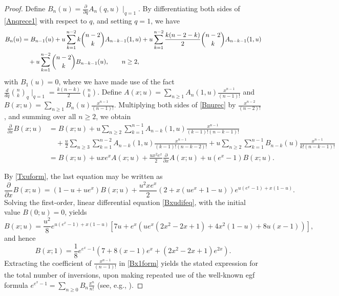 \documentclass[11pt,a4paper]{article}
\begin{document}
\begin{proof}
Define $B_n(u)=\frac{\partial}{\partial q}A_n(q,u)\mid_{q=1}$. By differentiating both sides of \eqref{Anqrece1} with respect to $q$, and setting $q=1$, we have
\begin{align}
B_n(u)&=B_{n-1}(u)
+u\sum_{k=1}^{n-2}k\binom{n-2}{k}A_{n-k-1}(1,u)+u\sum_{k=1}^{n-2}\frac{k(n-2-k)}{2}\binom{n-2}{k}A_{n-k-1}(1,u)\notag\\
&\quad+u\sum_{k=1}^{n-2}\binom{n-2}{k}B_{n-k-1}(u), \qquad n \geq 2, \label{Bnurec}
\end{align}
with $B_1(u)=0$, where we have made use of the fact $\frac{d}{dq}\binom{n}{k}_q\mid_{q=1}=\frac{k(n-k)}{2}\binom{n}{k}$.  Define $A(x;u)=\sum_{n\geq1}A_n(1,u)\frac{x^{n-1}}{(n-1)!}$ and $B(x;u)=\sum_{n\geq1}B_n(u)\frac{x^{n-1}}{(n-1)!}$. Multiplying both sides of \eqref{Bnurec} by $\frac{x^{n-2}}{(n-2)!}$, and summing over all $n \geq2$, we obtain
\begin{align*}
\frac{\partial}{\partial x}B(x;u)&=B(x;u)
+u\sum_{n\geq2}\sum_{k=1}^{n-1}A_{n-k}(1,u)\frac{x^{n-1}}{(k-1)!(n-k-1)!}\\
&\quad+\frac{u}{2}\sum_{n\geq3}\sum_{k=1}^{n-2}A_{n-k}(1,u)\frac{x^{n-1}}{(k-1)!(n-k-2)!}+u\sum_{n\geq2}\sum_{k=1}^{n-1}B_{n-k}(u)\frac{x^{n-1}}{k!(n-k-1)!}\\
&=B(x;u)+uxe^xA(x;u)+\frac{ux^2e^x}{2}\frac{\partial}{\partial x}A(x;u)+u(e^x-1)B(x;u).
\end{align*}

By \eqref{Txuform}, the last equation may be written as
\begin{equation}\label{Bxudifeq}
\frac{\partial}{\partial x}B(x;u)=(1-u+ue^x)B(x;u)+\frac{u^2xe^x}{2}\left(2+x(ue^x+1-u)\right)e^{u(e^x-1)+x(1-u)}.
\end{equation}
Solving the first-order, linear differential equation \eqref{Bxudifeq}, with the initial value $B(0;u)=0$, yields
$$B(x;u)=\frac{u^2}{8}e^{u(e^x-1)+x(1-u)}
\left[7u+e^x\left(ue^x(2x^2-2x+1)+4x^2(1-u)+8u(x-1)\right)\right],$$
and hence
\begin{equation}\label{Bx1form}
B(x;1)=\frac{1}{8}e^{e^x-1}\left(7+8(x-1)e^x+(2x^2-2x+1)e^{2x}\right).
\end{equation}
Extracting the coefficient of $\frac{x^{n-1}}{(n-1)!}$ in \eqref{Bx1form} yields the stated expression for the total number of inversions, upon making repeated use of the well-known egf formula $e^{e^x-1}=\sum_{n\geq0}B_n\frac{x^n}{n!}$ (see, e.g., \cite[p.\,34]{Stan}).
\end{proof}
\end{document}
